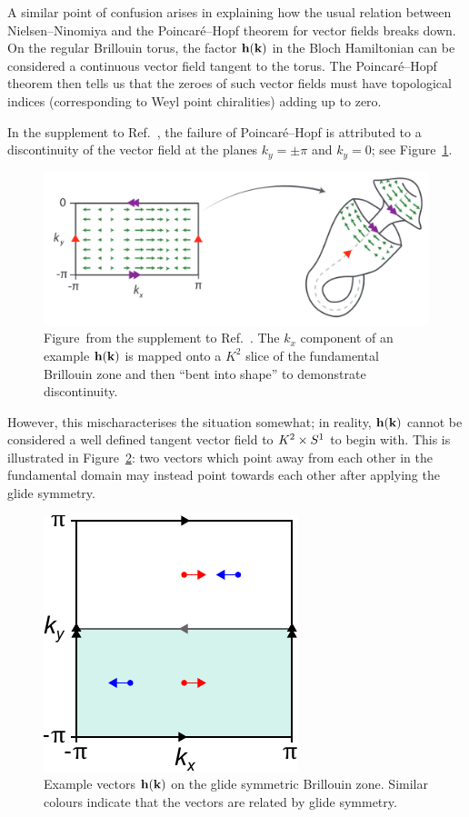 A similar point of confusion arises in explaining how the usual relation between Nielsen--Ninomiya and the Poincaré--Hopf theorem for vector fields breaks down. On the regular Brillouin torus, the factor $\vb{h}(\vb{k})$ in the Bloch Hamiltonian can be considered a continuous vector field tangent to the torus. The Poincaré--Hopf theorem then tells us that the zeroes of such vector fields must have topological indices (corresponding to Weyl point chiralities) adding up to zero.

In the supplement to Ref.~\cite{Fonseca-Vaidya_nonorientable}, the failure of Poincaré--Hopf is attributed to a discontinuity of the vector field at the planes $k_y=\pm\pi$ and $k_y=0$; see Figure~\ref{fig:Klein-discontinuity}.
\begin{figure}[htb!]
	\centering
	\includegraphics[width=.8\linewidth]{Images/Klein-discontinuity}
	\caption{Figure~from the supplement to Ref.~\cite{Fonseca-Vaidya_nonorientable}. The $k_x$ component of an example $\vb{h}(\vb{k})$ is mapped onto a $K^2$ slice of the fundamental Brillouin zone and then ``bent into shape'' to demonstrate discontinuity.
	}
	\label{fig:Klein-discontinuity}
\end{figure}
However, this mischaracterises the situation somewhat; in reality, $\vb{h}(\vb{k})$ cannot be considered a well defined tangent vector field to $K^2\times S^1$ to begin with. This is illustrated in Figure~\ref{fig:BZ_vectors}: two vectors which point away from each other in the fundamental domain may instead point towards each other after applying the glide symmetry.
\begin{figure}[htb!]
	\centering
	\includegraphics[width=.3\linewidth]{Images/BZ_vectors}
	\caption{Example vectors $\vb{h}(\vb{k})$ on the glide symmetric Brillouin zone. Similar colours indicate that the vectors are related by glide symmetry.} %
	\label{fig:BZ_vectors}
\end{figure}
